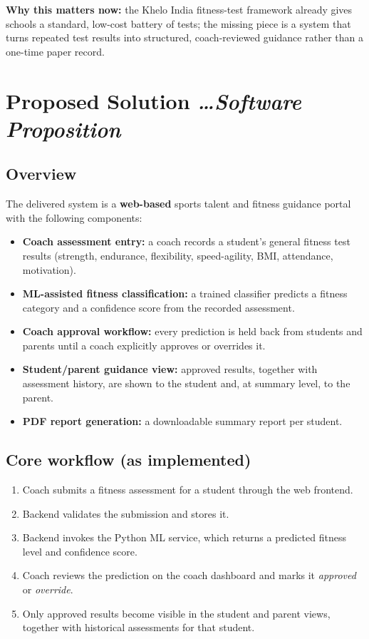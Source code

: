 \documentclass[11pt,a4paper]{article}
\newcommand{\BvrHint}[1]{%
  {\normalfont\normalsize\itshape\hfill #1}}
\begin{document}
\textbf{Why this matters now:} the Khelo India fitness-test framework already gives schools a standard, low-cost battery of tests; the missing piece is a system that turns repeated test results into structured, coach-reviewed guidance rather than a one-time paper record.

\section{Proposed Solution %
\BvrHint{\ldots Software Proposition}}
\subsection{Overview}
The delivered system is a \textbf{web-based} sports
talent and fitness guidance portal with the following
components:
\begin{itemize}[leftmargin=0.7cm]
    \item \textbf{Coach assessment entry:} a coach records a student's general fitness test results (strength, endurance, flexibility, speed-agility, BMI, attendance, motivation).
    \item \textbf{ML-assisted fitness classification:} a trained classifier predicts a fitness category and a confidence score from the recorded assessment.
    \item \textbf{Coach approval workflow:} every prediction is held back from students and parents until a coach explicitly approves or overrides it.
    \item \textbf{Student/parent guidance view:} approved results, together with assessment history, are shown to the student and, at summary level, to the parent.
    \item \textbf{PDF report generation:} a downloadable summary report per student.
\end{itemize}

\subsection{Core workflow (as implemented)}
\begin{enumerate}[leftmargin=0.7cm]
    \item Coach submits a fitness assessment for a student through the web frontend.
    \item Backend validates the submission and stores it.
    \item Backend invokes the Python ML service, which returns a predicted fitness level and confidence score.
    \item Coach reviews the prediction on the coach dashboard and marks it \emph{approved} or \emph{override}.
    \item Only approved results become visible in the student and parent views, together with historical assessments for that student.
\end{enumerate}
\end{document}
